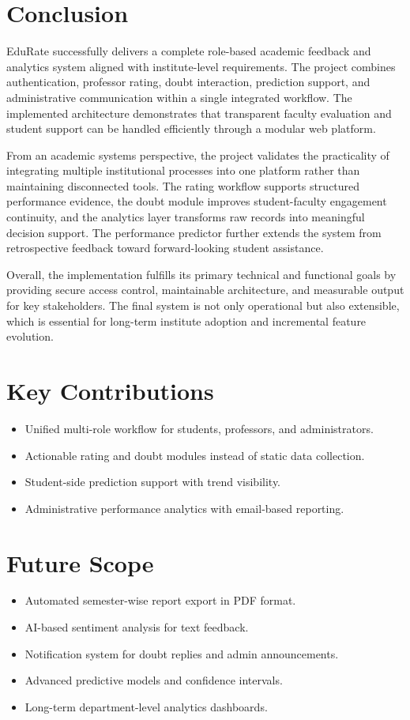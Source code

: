\section{Conclusion}
EduRate successfully delivers a complete role-based academic feedback and analytics system aligned with institute-level requirements. The project combines authentication, professor rating, doubt interaction, prediction support, and administrative communication within a single integrated workflow. The implemented architecture demonstrates that transparent faculty evaluation and student support can be handled efficiently through a modular web platform.

From an academic systems perspective, the project validates the practicality of integrating multiple institutional processes into one platform rather than maintaining disconnected tools. The rating workflow supports structured performance evidence, the doubt module improves student-faculty engagement continuity, and the analytics layer transforms raw records into meaningful decision support. The performance predictor further extends the system from retrospective feedback toward forward-looking student assistance.

Overall, the implementation fulfills its primary technical and functional goals by providing secure access control, maintainable architecture, and measurable output for key stakeholders. The final system is not only operational but also extensible, which is essential for long-term institute adoption and incremental feature evolution.

\section{Key Contributions}
\begin{itemize}[leftmargin=1.5em]
    \item Unified multi-role workflow for students, professors, and administrators.
    \item Actionable rating and doubt modules instead of static data collection.
    \item Student-side prediction support with trend visibility.
    \item Administrative performance analytics with email-based reporting.
\end{itemize}

\section{Future Scope}
\begin{itemize}[leftmargin=1.5em]
    \item Automated semester-wise report export in PDF format.
    \item AI-based sentiment analysis for text feedback.
    \item Notification system for doubt replies and admin announcements.
    \item Advanced predictive models and confidence intervals.
    \item Long-term department-level analytics dashboards.
\end{itemize}

